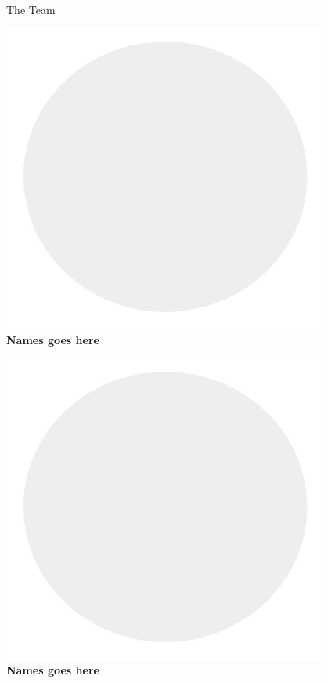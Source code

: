 \documentclass{beamer}
\begin{document}
\begin{frame}[t]{The Team}
	\begin{minipage}{0.3\linewidth}
		\begin{center}
			\includegraphics[width=0.8\textwidth]{show-team/avatar-placeholder.png}\\
		\textbf{Names goes here}
		\end{center}
	\end{minipage}
	\hfill
	\begin{minipage}{0.3\linewidth}
		\begin{center}
			\includegraphics[width=0.8\textwidth]{show-team/avatar-placeholder.png}\\
		\textbf{Names goes here}
		\end{center}

\end{minipage}
\end{frame}
\end{document}
